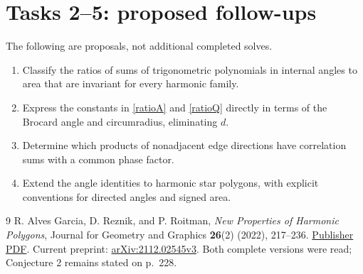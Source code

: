 \documentclass[11pt]{article}
\begin{document}
\section*{Tasks 2--5: proposed follow-ups}
The following are proposals, not additional completed solves.
\begin{enumerate}[label=\textbf{Task \arabic*.},start=2,leftmargin=*]
\item Classify the ratios of sums of trigonometric polynomials in internal
angles to area that are invariant for every harmonic family.
\item Express the constants in \eqref{ratioA} and \eqref{ratioQ} directly
in terms of the Brocard angle and circumradius, eliminating $d$.
\item Determine which products of nonadjacent edge directions have
correlation sums with a common phase factor.
\item Extend the angle identities to harmonic star polygons, with explicit
conventions for directed angles and signed area.
\end{enumerate}

\begin{thebibliography}{9}
 R. Alves Garcia, D. Reznik, and P. Roitman,
\emph{New Properties of Harmonic Polygons}, Journal for Geometry and
Graphics \textbf{26}(2) (2022), 217--236.
\href{https://www.heldermann-verlag.de/jgg/jgg26/j26h2alve.pdf}{Publisher PDF}.
Current preprint: \href{https://arxiv.org/abs/2112.02545}{arXiv:2112.02545v3}.
Both complete versions were read; Conjecture 2 remains stated on p.~228.
\end{thebibliography}
\end{document}
